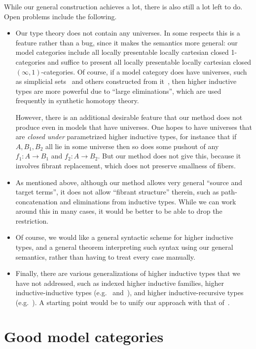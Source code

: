 \documentclass{amsart}
\begin{document}
While our general construction achieves a lot, there is also still a lot left to do.
Open problems include the following.
\begin{itemize}
\item Our type theory does not contain any universes.
  In some respects this is a feature rather than a bug, since it makes the semantics more general: our model categories include all locally presentable locally cartesian closed 1-categories and suffice to present all locally presentable locally cartesian closed $(\infty,1)$-categories.
  Of course, if a model category does have universes, such as simplicial sets~\cite{klv:ssetmodel} and others constructed from it~\cite{shulman:invdia,shulman:elreedy,cisinski:elegant,shulman:eiuniv}, then higher inductive types are more powerful due to ``large eliminations'', which are used frequently in synthetic homotopy theory.

  However, there is an additional desirable feature that our method does not produce even in models that have universes.
  One hopes to have universes that are \emph{closed under} parametrized higher inductive types, for instance that if $A,B_1,B_2$ all lie in some universe then so does some pushout of any $f_1:A\to B_1$ and $f_2:A\to B_2$.
  But our method does not give this, because it involves fibrant replacement, which does not preserve smallness of fibers.
\item As mentioned above, although our method allows very general ``source and target terms'', it does not allow ``fibrant structure'' therein, such as path-concatenation and eliminations from inductive types.
  While we can work around this in many cases, it would be better to be able to drop the restriction.
\item Of course, we would like a general syntactic scheme for higher inductive types, and a general theorem interpreting such syntax using our general semantics, rather than having to treat every case manually.
\item Finally, there are various generalizations of higher inductive types that we have not addressed, such as indexed higher inductive families, higher inductive-inductive types (e.g.~\cite[Chapter 11]{hottbook} and~\cite{ak:tt-qit}), and higher inductive-recursive types (e.g.~\cite{shulman:hiru-tdd}).
  A starting point would be to unify our approach with that of~\cite{acdf:qiits}.
\end{itemize}


\section{Good model categories}
\label{sec:model-categ-type}
\end{document}
